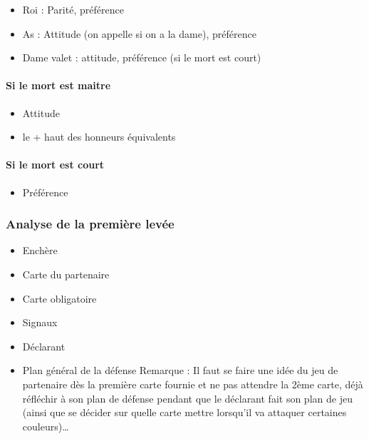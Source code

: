 \documentclass[a4paper]{article}
\begin{document}
\begin{itemize}
\item Roi : Parité, préférence

\item As : Attitude (on appelle si on a la dame), préférence

\item Dame valet : attitude, préférence (si le mort est court)

\end{itemize}

\paragraph{Si le mort est maitre}

\begin{itemize}
\item Attitude

\item le + haut des honneurs équivalents

\end{itemize}

\paragraph{Si le mort est court}

\begin{itemize}
\item Préférence

\end{itemize}

\subsubsection{Analyse de la première levée}

\begin{itemize}
\item Enchère

\item Carte du partenaire

\item Carte obligatoire

\item Signaux

\item Déclarant

\item Plan général de la défense
Remarque : Il faut se faire une idée du jeu de partenaire dès la première carte fournie et ne pas attendre la 2ème carte, déjà réfléchir à son plan de défense pendant que le déclarant fait son plan de jeu (ainsi que se décider sur quelle carte mettre lorsqu’il va attaquer certaines couleurs)…

\end{itemize}
\end{document}
